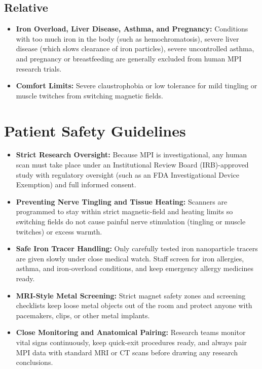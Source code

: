 \subsection{Relative}

\begin{itemize}
    \item \textbf{Iron Overload, Liver Disease, Asthma, and Pregnancy:} Conditions with too much iron in the body (such as hemochromatosis), severe liver disease (which slows clearance of iron particles), severe uncontrolled asthma, and pregnancy or breastfeeding are generally excluded from human MPI research trials.
    \item \textbf{Comfort Limits:} Severe claustrophobia or low tolerance for mild tingling or muscle twitches from switching magnetic fields.
\end{itemize}

\section{Patient Safety Guidelines}

\begin{itemize}
    \item \textbf{Strict Research Oversight:} Because MPI is investigational, any human scan must take place under an Institutional Review Board (IRB)-approved study with regulatory oversight (such as an FDA Investigational Device Exemption) and full informed consent.
    \item \textbf{Preventing Nerve Tingling and Tissue Heating:} Scanners are programmed to stay within strict magnetic-field and heating limits so switching fields do not cause painful nerve stimulation (tingling or muscle twitches) or excess warmth.
    \item \textbf{Safe Iron Tracer Handling:} Only carefully tested iron nanoparticle tracers are given slowly under close medical watch. Staff screen for iron allergies, asthma, and iron-overload conditions, and keep emergency allergy medicines ready.
    \item \textbf{MRI-Style Metal Screening:} Strict magnet safety zones and screening checklists keep loose metal objects out of the room and protect anyone with pacemakers, clips, or other metal implants.
    \item \textbf{Close Monitoring and Anatomical Pairing:} Research teams monitor vital signs continuously, keep quick-exit procedures ready, and always pair MPI data with standard MRI or CT scans before drawing any research conclusions.
\end{itemize}

